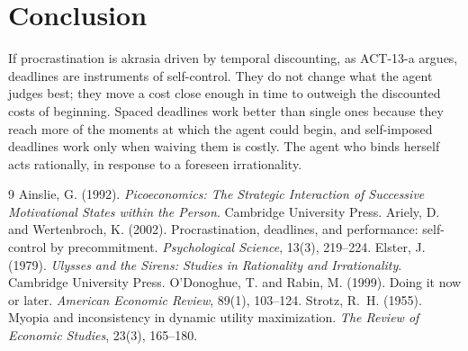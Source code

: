 \documentclass{situationist-preprint}
\begin{document}
\section{Conclusion}

If procrastination is akrasia driven by temporal discounting, as ACT-13-a argues, deadlines are instruments of self-control. They do not change what the agent judges best; they move a cost close enough in time to outweigh the discounted costs of beginning. Spaced deadlines work better than single ones because they reach more of the moments at which the agent could begin, and self-imposed deadlines work only when waiving them is costly. The agent who binds herself acts rationally, in response to a foreseen irrationality.

\begin{thebibliography}{9}\small
{} Ainslie, G. (1992). \emph{Picoeconomics: The Strategic Interaction of Successive Motivational States within the Person}. Cambridge University Press.
 Ariely, D. and Wertenbroch, K. (2002). Procrastination, deadlines, and performance: self-control by precommitment. \emph{Psychological Science}, 13(3), 219--224.
 Elster, J. (1979). \emph{Ulysses and the Sirens: Studies in Rationality and Irrationality}. Cambridge University Press.
 O'Donoghue, T. and Rabin, M. (1999). Doing it now or later. \emph{American Economic Review}, 89(1), 103--124.
 Strotz, R.~H. (1955). Myopia and inconsistency in dynamic utility maximization. \emph{The Review of Economic Studies}, 23(3), 165--180.
\end{thebibliography}
\end{document}
